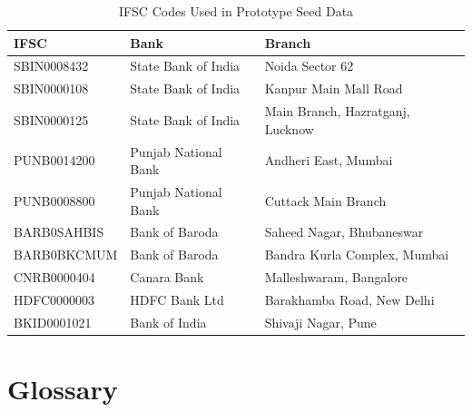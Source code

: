 \documentclass[12pt, a4paper]{report}
\begin{document}
\begin{table}[H]
\centering
\caption{IFSC Codes Used in Prototype Seed Data}
\begin{tabularx}{\textwidth}{|l|l|X|}
\hline
\textbf{IFSC} & \textbf{Bank} & \textbf{Branch} \\
\hline
SBIN0008432 & State Bank of India & Noida Sector 62 \\
SBIN0000108 & State Bank of India & Kanpur Main Mall Road \\
SBIN0000125 & State Bank of India & Main Branch, Hazratganj, Lucknow \\
PUNB0014200 & Punjab National Bank & Andheri East, Mumbai \\
PUNB0008800 & Punjab National Bank & Cuttack Main Branch \\
BARB0SAHBIS & Bank of Baroda & Saheed Nagar, Bhubaneswar \\
BARB0BKCMUM & Bank of Baroda & Bandra Kurla Complex, Mumbai \\
CNRB0000404 & Canara Bank & Malleshwaram, Bangalore \\
HDFC0000003 & HDFC Bank Ltd & Barakhamba Road, New Delhi \\
BKID0001021 & Bank of India & Shivaji Nagar, Pune \\
\hline
\end{tabularx}
\end{table}


\chapter{Glossary}
\end{document}
